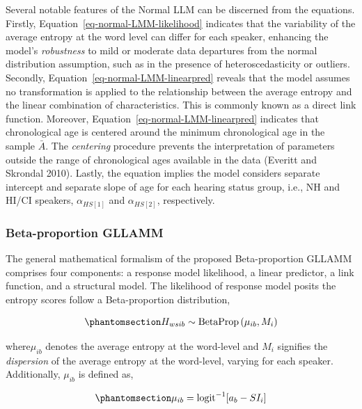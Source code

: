 \documentclass[
sn-apacite
]{sn-jnl}
\begin{document}
Several notable features of the Normal LLM can be discerned from the
equations. Firstly, Equation~\ref{eq-normal-LMM-likelihood} indicates
that the variability of the average entropy at the word level can differ
for each speaker, enhancing the model's \emph{robustness} to mild or
moderate data departures from the normal distribution assumption, such
as in the presence of heteroscedasticity or outliers. Secondly,
Equation~\ref{eq-normal-LMM-linearpred} reveals that the model assumes
no transformation is applied to the relationship between the average
entropy and the linear combination of characteristics. This is commonly
known as a direct link function. Moreover,
Equation~\ref{eq-normal-LMM-linearpred} indicates that chronological age
is centered around the minimum chronological age in the sample
\(\bar{A}\). The \emph{centering} procedure prevents the interpretation
of parameters outside the range of chronological ages available in the
data (Everitt and Skrondal 2010). Lastly, the equation implies the model
considers separate intercept and separate slope of age for each hearing
status group, i.e., NH and HI/CI speakers, \(\alpha_{HS[1]}\) and
\(\alpha_{HS[2]}\), respectively.

\subsubsection{Beta-proportion GLLAMM}\label{sec-M-SM-BGLLAMM}

The general mathematical formalism of the proposed Beta-proportion
GLLAMM comprises four components: a response model likelihood, a linear
predictor, a link function, and a structural model. The likelihood of
response model posits the entropy scores follow a Beta-proportion
distribution,

\begin{equation}\phantomsection\label{eq-beta-GLLAMM-likelihood}{
H_{wsib} \sim \text{BetaProp} \left( \mu_{ib}, M_{i} \right)
}\end{equation}

where\(\mu_{ib}\) denotes the average entropy at the word-level and
\(M_{i}\) signifies the \emph{dispersion} of the average entropy at the
word-level, varying for each speaker. Additionally, \(\mu_{ib}\) is
defined as,

\begin{equation}\phantomsection\label{eq-beta-GLLAMM-linpred}{
\mu_{ib} = \text{logit}^{-1}[ a_{b} - SI_{i} ]
}\end{equation}
\end{document}
